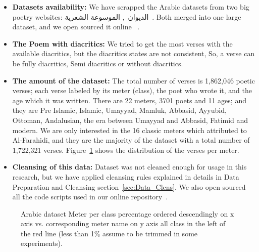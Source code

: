 \begin{itemize}

  \item \textbf{Datasets availability:} We have scrapped the Arabic datasets from two big poetry websites: \textarabic{الديوان}~\cite{diwan}, \textarabic{الموسوعة الشعرية}~\cite{PoetryEncyclopedia2016}. Both merged into one large dataset, and we open sourced it online ~\cite{ArabicpoetryDS}.

  \item \textbf{The Poem with diacritics:} We tried to get the most verses with the available diacritics, but the diacritics states are not consistent, So, a verse can be fully diacritics, Semi diacritics or without diacritics.

  \item \textbf{The amount of the dataset:} The total number of verses is 1,862,046 poetic verses; each verse labeled by its meter (class), the poet who wrote it, and the age which it was written. There are 22 meters, 3701 poets and 11 ages; and they are Pre Islamic, Islamic, Umayyad, Mamluk, Abbasid, Ayyubid, Ottoman, Andalusian, the era between Umayyad and Abbasid, Fatimid and modern. We are only interested in the 16 classic meters which attributed to Al-Farahidi, and they are the majority of the dataset with a total number of 1,722,321 verses. Figure~\ref{Fig:Data_Size_Distribution} shows the distribution of the verses per meter. %
  
  \item \textbf{Cleansing of this data:} Dataset was not cleaned enough for usage in this research, but we have applied cleansing rules explained in details in Data Preparation and Cleansing section~\ref{sec:Data_Clens}. We also open sourced all the code scripts used in our online repository~\cite{HCILAB_ArabicPoetry_2018}.
\end{itemize}

\begin{figure}[!t]
  \centering
  \begin{tikzpicture}
    
  \end{tikzpicture}%
  \caption{Arabic dataset Meter per class percentage ordered descendingly on x axis vs. corresponding meter name on y axis all class in the left of the red line (less than 1\% assume to be trimmed in some experiments).	}\label{Fig:Data_Size_Distribution}
\end{figure}

